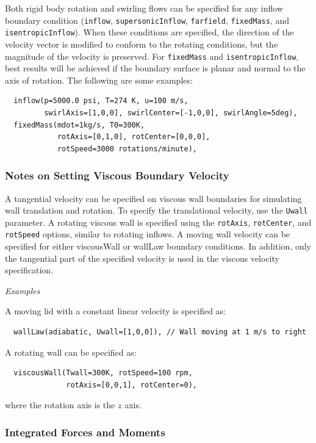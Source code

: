 \documentclass{article}
\begin{document}
Both rigid body rotation and swirling flows can be specified for any
inflow boundary condition ({\tt inflow}, {\tt supersonicInflow}, {\tt farfield}, {\tt fixedMass},
and {\tt isentropicInflow}).  When these conditions are specified, the
direction of the velocity vector is modified to conform to the
rotating conditions, but the magnitude of the velocity is preserved.
For {\tt fixedMass} and {\tt isentropicInflow}, best results
will be achieved if the boundary surface is planar and normal to the
axis of rotation.  The following are some examples:

\begin{verbatim}
  inflow(p=5000.0 psi, T=274 K, u=100 m/s, 
         swirlAxis=[1,0,0], swirlCenter=[-1,0,0], swirlAngle=5deg),
  fixedMass(mdot=1kg/s, T0=300K, 
            rotAxis=[0,1,0], rotCenter=[0,0,0], 
            rotSpeed=3000 rotations/minute),
\end{verbatim}

\subsubsection{ Notes on Setting Viscous Boundary Velocity }

A tangential velocity can be specified on viscous wall boundaries for
simulating wall translation and rotation.  To specify the translational
velocity, use the {\tt Uwall} parameter.  A rotating viscous wall is
specified using the {\tt rotAxis}, {\tt rotCenter}, and {\tt rotSpeed}
options, similar to rotating inflows.  A moving wall velocity
can be specified for either viscousWall or wallLaw boundary
conditions.  In addition, only the tangential part of the specified
velocity is used in the viscous velocity specification.  

{\center \it Examples}

A moving lid with a constant linear velocity is specified as:
\begin{verbatim}
  wallLaw(adiabatic, Uwall=[1,0,0]), // Wall moving at 1 m/s to right
\end{verbatim}
A rotating wall can be specified as:
\begin{verbatim}
  viscousWall(Twall=300K, rotSpeed=100 rpm, 
              rotAxis=[0,0,1], rotCenter=0),
\end{verbatim}
where the rotation axis is the $z$ axis.


\subsubsection{Integrated Forces and Moments}
\label{integrated_fm}
\end{document}
